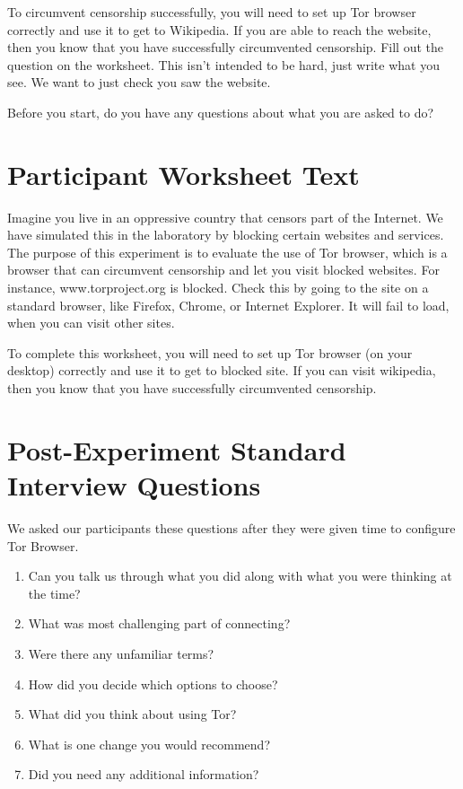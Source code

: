 \documentclass[USenglish,oneside,twocolumn]{article}
\begin{document}
To circumvent censorship successfully, you will need to set up Tor browser correctly and use it to get to Wikipedia. If you are able to reach the website, then you know that you have successfully circumvented censorship. Fill out the question on the worksheet. This isn't intended to be hard, just write what you see. We want to just check you saw the website. 

Before you start, do you have any questions about what you are asked to do? 

\section{Participant Worksheet Text} 
\label{participant-worksheet}
Imagine you live in an oppressive country that censors part of the Internet. We have simulated this in the laboratory by blocking certain websites and services. The purpose of this experiment is to evaluate the use of Tor browser, which is a browser that can circumvent censorship and let you visit blocked websites. For instance, www.torproject.org is blocked. Check this by going to the site on a standard browser, like Firefox, Chrome, or Internet Explorer. It will fail to load, when you can visit other sites.

To complete this worksheet, you will need to set up Tor browser (on your desktop) correctly and use it to get to blocked site. If you can visit wikipedia, then you know that you have successfully circumvented censorship.

\section{Post-Experiment Standard Interview Questions}
\label{interview-questions}
We asked our participants these questions after they were given time to configure Tor Browser. \\

\begin{enumerate}
\item{Can you talk us through what you did along with what you were thinking at the time?}
\item{What was most challenging part of connecting?}
\item{Were there any unfamiliar terms?}
\item{How did you decide which options to choose?}
\item{What did you think about using Tor?}
\item{What is one change you would recommend?} 
\item{Did you need any additional information?} 
\end{enumerate}  
\end{document}
